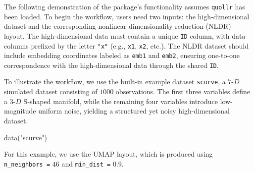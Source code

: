 \documentclass[
  11pt,
  a4paper,
]{report}
\newenvironment{Shaded}{\begin{snugshade}}{\end{snugshade}}
\newcommand{\AttributeTok}[1]{\textcolor[rgb]{0.40,0.45,0.13}{#1}}
\newcommand{\DecValTok}[1]{\textcolor[rgb]{0.68,0.00,0.00}{#1}}
\newcommand{\FloatTok}[1]{\textcolor[rgb]{0.68,0.00,0.00}{#1}}
\newcommand{\FunctionTok}[1]{\textcolor[rgb]{0.28,0.35,0.67}{#1}}
\newcommand{\NormalTok}[1]{\textcolor[rgb]{0.00,0.23,0.31}{#1}}
\newcommand{\OtherTok}[1]{\textcolor[rgb]{0.00,0.23,0.31}{#1}}
\newcommand{\SpecialCharTok}[1]{\textcolor[rgb]{0.37,0.37,0.37}{#1}}
\newcommand{\StringTok}[1]{\textcolor[rgb]{0.13,0.47,0.30}{#1}}
\begin{document}
The following demonstration of the package's functionality assumes
\texttt{quollr} has been loaded. To begin the workflow, users need two
inputs: the high-dimensional dataset and the corresponding nonlinear
dimensionality reduction (NLDR) layout. The high-dimensional data must
contain a unique \texttt{ID} column, with data columns prefixed by the
letter \texttt{"x"} (e.g., \texttt{x1}, \texttt{x2}, etc.). The NLDR
dataset should include embedding coordinates labeled as \texttt{emb1}
and \texttt{emb2}, ensuring one-to-one correspondence with the
high-dimensional data through the shared \texttt{ID}.

To illustrate the workflow, we use the built-in example dataset
\texttt{scurve}, a \(7\text{-}D\) simulated dataset consisting of
\(1000\) observations. The first three variables define a \(3\text{-}D\)
S-shaped manifold, while the remaining four variables introduce
low-magnitude uniform noise, yielding a structured yet noisy
high-dimensional dataset.

\begin{Shaded}
\begin{Highlighting}[]
\FunctionTok{data}\NormalTok{(}\StringTok{"scurve"}\NormalTok{)}
\end{Highlighting}
\end{Shaded}

For this example, we use the UMAP layout, which is produced using
\texttt{n\_neighbors\ =} \(46\) and \texttt{min\_dist\ =} \(0.9\).

\begin{Shaded}
\end{Shaded}
\end{document}
